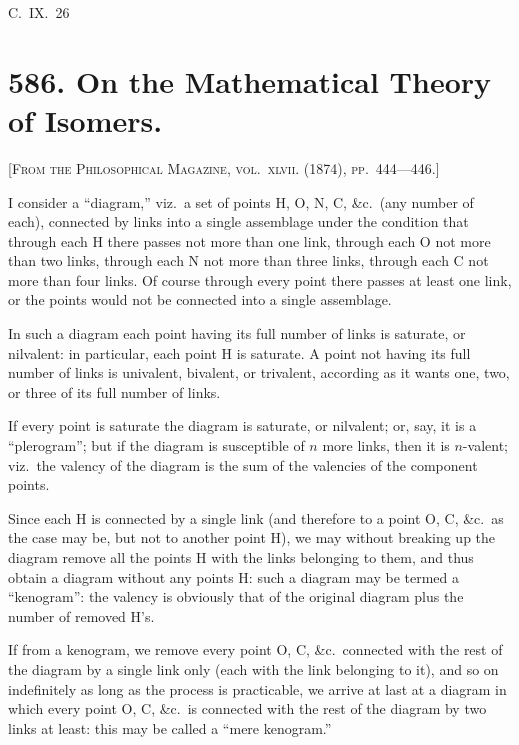 \documentclass[11pt,a4paper]{book}
\begin{document}
\hfill C.~IX.~26

\newpage

\section*{586. On the Mathematical Theory of Isomers.}

\noindent\textsc{[From the Philosophical Magazine, vol.~\textsc{xlvii}. (1874), pp.~444---446.]}

\medskip

\noindent I consider a ``diagram,'' viz.\ a set of points H, O, N, C, \&c.\ (any number of each), connected by links into a single assemblage under the condition that through each H there passes not more than one link, through each O not more than two links, through each N not more than three links, through each C not more than four links. Of course through every point there passes at least one link, or the points would not be connected into a single assemblage.

In such a diagram each point having its full number of links is saturate, or nilvalent: in particular, each point H is saturate. A point not having its full number of links is univalent, bivalent, or trivalent, according as it wants one, two, or three of its full number of links.

If every point is saturate the diagram is saturate, or nilvalent; or, say, it is a ``plerogram''; but if the diagram is susceptible of $n$ more links, then it is $n$-valent; viz.\ the valency of the diagram is the sum of the valencies of the component points.

Since each H is connected by a single link (and therefore to a point O, C, \&c.\ as the case may be, but not to another point H), we may without breaking up the diagram remove all the points H with the links belonging to them, and thus obtain a diagram without any points H: such a diagram may be termed a ``kenogram'': the valency is obviously that of the original diagram plus the number of removed H's.

If from a kenogram, we remove every point O, C, \&c.\ connected with the rest of the diagram by a single link only (each with the link belonging to it), and so on indefinitely as long as the process is practicable, we arrive at last at a diagram in which every point O, C, \&c.\ is connected with the rest of the diagram by two links at least: this may be called a ``mere kenogram.''
\end{document}
